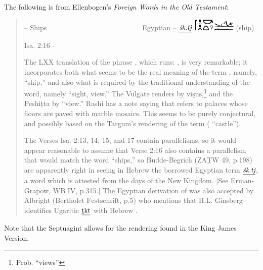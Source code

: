 The following is from Ellenbogen's \emph{Foreign Words in the Old Testament}:
\begin{quotation}
    {\noindent{} -- Ships~~~~~~~~~~~~~~~~~~~~~~~~~~~Egyptian -- $\underline{\emph{\'sk.tj}}$ \includegraphics[scale=1.1]{images/egt-ship} (ship)}
    
    {\noindent Isa. 2:16 -}
    
    The LXX translation of the phrase , which runs: , is very remarkable; it incorporates both what seems to be the real meaning of the term , namely,  ``ship,'' and also what is required by the traditional understanding of the word, namely  ``sight, view.'' The Vulgate renders  by $\underline{\text{visus}}$,\footnote{Prob. ``views''} and the Peshi\d{t}ta by  ``view.'' Rashi has a note saying that  refers to palaces whose floors are paved with marble mosaics. This seems to be purely conjectural, and possibly based on the Targum's rendering of the term ( ``castle'').
    
    The Verses Isa. 2:13, 14, 15, and 17 contain parallelisms, so it would appear reasonable to assume that Verse 2:16 also contains a parallelism that would match the word  ``ships,'' so Budde-Begrich ($\underline{\text{ZATW}}$ 49, p.198) are apparently right in seeing in Hebrew  the borrowed Egyptian term $\underline{\emph{\'sk.tj}}$, a word which is attested from the days of the New Kingdom. [See Erman-Grapow, $\underline{\text{WB}}$ IV, p.315.] The Egyptian derivation of  was also accepted by Albright ($\underline{\text{Bertholet Festschrift}}$, p.5) who mentions that H.L. Ginsberg identifies Ugaritic $\underline{\text{\underline{t}kt}}$ with Hebrew .
\end{quotation}

Note that the Septuagint allows for the rendering found in the King James Version.
